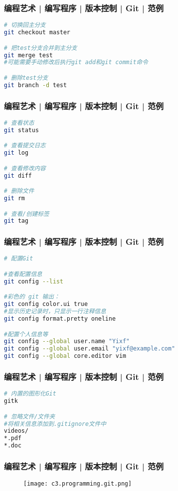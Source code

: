 \begin{frame}[fragile]
  \frametitle{编程艺术 | 编写程序 | 版本控制 | Git | \alert{范例}}
\begin{lstlisting}[language=sh]
# 切换回主分支
git checkout master

# 把test分支合并到主分支
git merge test
#可能需要手动修改后执行git add和git commit命令

# 删除test分支
git branch -d test
\end{lstlisting}
\end{frame}

\begin{frame}[fragile]
  \frametitle{编程艺术 | 编写程序 | 版本控制 | Git | \alert{范例}}
\begin{lstlisting}[language=sh]
# 查看状态
git status

# 查看提交日志
git log

# 查看修改内容
git diff

# 删除文件
git rm

# 查看/创建标签
git tag
\end{lstlisting}
\end{frame}

\begin{frame}[fragile]
  \frametitle{编程艺术 | 编写程序 | 版本控制 | Git | 范例}
\begin{lstlisting}[language=sh]
# 配置Git

#查看配置信息
git config --list

#彩色的 git 输出：
git config color.ui true
#显示历史记录时，只显示一行注释信息
git config format.pretty oneline

#配置个人信息等
git config --global user.name "Yixf"
git config --global user.email "yixf@example.com"
git config --global core.editor vim
\end{lstlisting}
\end{frame}

\begin{frame}[fragile]
  \frametitle{编程艺术 | 编写程序 | 版本控制 | Git | 范例}
\begin{lstlisting}[language=sh]
# 内置的图形化Git
gitk

# 忽略文件/文件夹
#将相关信息添加到.gitignore文件中
videos/
*.pdf
*.doc
\end{lstlisting}
\end{frame}

\begin{frame}
  \frametitle{编程艺术 | 编写程序 | 版本控制 | Git | \alert{范例}}
  \begin{figure}
    \centering
    \texttt{[image: c3.programming.git.png]}
  \end{figure}
\end{frame}

